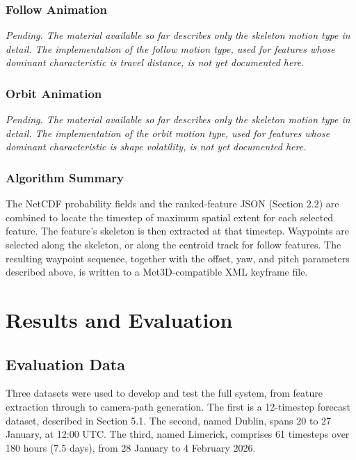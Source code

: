 \documentclass[journal abbreviation, manuscript]{copernicus}
\begin{document}
\subsubsection{Follow Animation}

\textit{Pending. The material available so far describes only the
skeleton motion type in detail. The implementation of the follow
motion type, used for features whose dominant characteristic is
travel distance, is not yet documented here.}

\subsubsection{Orbit Animation}

\textit{Pending. The material available so far describes only the
skeleton motion type in detail. The implementation of the orbit
motion type, used for features whose dominant characteristic is
shape volatility, is not yet documented here.}

\subsubsection{Algorithm Summary}

The NetCDF probability fields and the ranked-feature JSON (Section 2.2)
are combined to locate the timestep of maximum spatial extent for each
selected feature. The feature's skeleton is then extracted at that
timestep. Waypoints are selected along the skeleton, or along the
centroid track for follow features. The resulting waypoint sequence,
together with the offset, yaw, and pitch parameters described above, is
written to a Met3D-compatible XML keyframe file.
\section{Results and Evaluation}

\subsection{Evaluation Data}

Three datasets were used to develop and test the full system, from
feature extraction through to camera-path generation. The first is a
12-timestep forecast dataset, described in Section 5.1. The second,
named Dublin, spans 20 to 27 January, at 12:00 UTC. The third, named
Limerick, comprises 61 timesteps over 180 hours (7.5 days), from 28
January to 4 February 2026.
\end{document}
